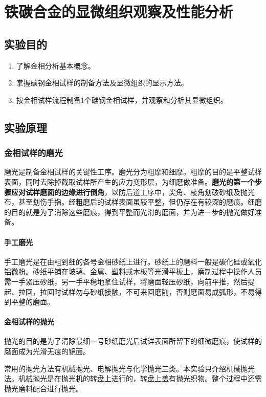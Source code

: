 \chapter{铁碳合金的显微组织观察及性能分析}
\section{实验目的}
    \begin{enumerate}
        \item 了解金相分析基本概念。
        \item 掌握碳钢金相试样的制备方法及显微组织的显示方法。
        \item 按金相试样流程制备1个碳钢金相试样，并观察和分析其显微组织。
    \end{enumerate}
\section{实验原理}%
    \subsection{金相试样的磨光}
    磨光是制备金相试样的关键性工序。磨光分为粗摩和细摩。粗摩的目的是平整试样表面，同时去除掉截取试样所产生的应力变形层，为细磨做准备。\textbf{磨光的第一个步骤应对试样磨面的边缘进行倒角}，以防后道工序中，尖角、棱角划破砂纸及抛光布，甚至划伤手指。经粗磨后的试样表面虽较平整，但仍存在有较深的磨痕。细磨的目的就是为了消除这些磨痕，得到平整而光滑的磨面，并为进一步的抛光做好准备。
        \subsubsection{手工磨光}
        手工磨光是在由粗到细的各号金相砂纸上进行。砂纸上的磨料一般是碳化硅或氧化铝微粉。砂纸平铺在玻璃、金属、塑料或木板等光滑平板上，磨制过程中操作人员需一手紧压砂纸，另一手平稳地拿住试样，将磨面轻压砂纸，向前平推，然后提起、拉回，拉回时试样勿与砂纸接触，不可来回磨削，否则磨面易成弧形，不易得到平整的磨面。
        \subsubsection{金相试样的抛光}
        抛光的目的是为了清除最细一号砂纸磨光后试详表面所留下的细微磨痕，使试样的磨面成为光滑无痕的镜面。\par
        常用的抛光方法有机械抛光、电解抛光与化学抛光三类。本实验只介绍机械抛光法。机械抛光是在抛光机的转盘上进行的，转盘上盖有抛光织物。整个过程中还需抛光磨料配合进行抛光。

